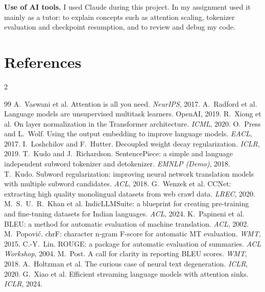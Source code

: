 \documentclass[10pt,a4paper]{article}
\begin{document}
\textbf{Use of AI tools.} I used Claude during this project. In my assignment used it mainly as a tutor: to explain concepts such as attention scaling, tokenizer evaluation and checkpoint resumption, and to review and debug my code.

\section*{References}
\vspace{-4pt}
{\footnotesize
\setlength{\columnsep}{14pt}
\begin{multicols}{2}
\renewcommand{\section}[2]{}
\begin{thebibliography}{99}\setlength{\itemsep}{0pt}
 A.~Vaswani et al. Attention is all you need. \emph{NeurIPS}, 2017.
 A.~Radford et al. Language models are unsupervised multitask learners. OpenAI, 2019.
 R.~Xiong et al. On layer normalization in the Transformer architecture. \emph{ICML}, 2020.
 O.~Press and L.~Wolf. Using the output embedding to improve language models. \emph{EACL}, 2017.
 I.~Loshchilov and F.~Hutter. Decoupled weight decay regularization. \emph{ICLR}, 2019.
 T.~Kudo and J.~Richardson. SentencePiece: a simple and language independent subword tokenizer and detokenizer. \emph{EMNLP (Demo)}, 2018.
 T.~Kudo. Subword regularization: improving neural network translation models with multiple subword candidates. \emph{ACL}, 2018.
 G.~Wenzek et al. CCNet: extracting high quality monolingual datasets from web crawl data. \emph{LREC}, 2020.
 M.~S.~U.~R.~Khan et al. IndicLLMSuite: a blueprint for creating pre-training and fine-tuning datasets for Indian languages. \emph{ACL}, 2024.
 K.~Papineni et al. BLEU: a method for automatic evaluation of machine translation. \emph{ACL}, 2002.
 M.~Popović. chrF: character n-gram F-score for automatic MT evaluation. \emph{WMT}, 2015.
 C.-Y.~Lin. ROUGE: a package for automatic evaluation of summaries. \emph{ACL Workshop}, 2004.
 M.~Post. A call for clarity in reporting BLEU scores. \emph{WMT}, 2018.
 A.~Holtzman et al. The curious case of neural text degeneration. \emph{ICLR}, 2020.
 G.~Xiao et al. Efficient streaming language models with attention sinks. \emph{ICLR}, 2024.
\end{thebibliography}
\end{multicols}
}
\end{document}
